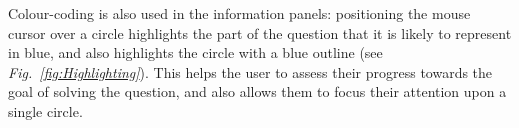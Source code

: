 \documentclass[12pt,twoside,notitlepage,xetex]{report}
\begin{document}
{Colour-coding is also used in the information panels: positioning the mouse cursor over a circle highlights the part of the question that it is likely to represent in blue, and also highlights the circle with a blue outline (see \emph{Fig.~\ref{fig:Highlighting}}).  This helps the user to assess their progress towards the goal of solving the question, and also allows them to focus their attention upon a single circle.

\begin{center}
\begin{figure}[H]
\begin{center}

\end{center}
\end{figure}
\end{center}}
\end{document}
